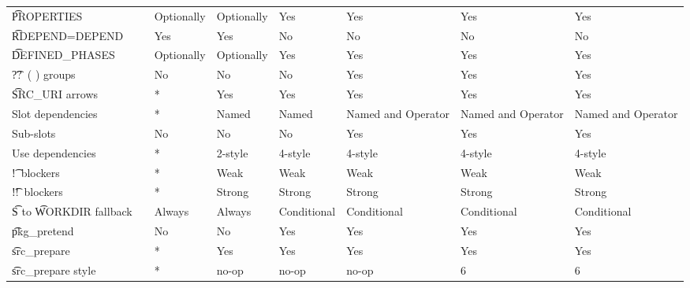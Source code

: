 \begin{landscape}
\begin{longtable}{llP{7.5em}P{7.5em}P{7.5em}P{7.5em}P{7.5em}P{7.5em}}
\t{PROPERTIES} &  &
    Optionally & Optionally & Yes & Yes & Yes & Yes \\

\t{RDEPEND=DEPEND} &  &
    Yes & Yes & No & No & No & No \\

\t{DEFINED_PHASES} &  &
    Optionally & Optionally & Yes & Yes & Yes & Yes \\

\t{??\ ( )} groups &  &
    No & No & No & Yes & Yes & Yes \\

\t{SRC_URI} arrows &  &
    * & Yes & Yes & Yes & Yes & Yes \\

Slot dependencies &  &
    * & Named & Named & Named and Operator & Named and Operator & Named and Operator \\

Sub-slots &  &
    No & No & No & Yes & Yes & Yes \\

Use dependencies &  &
    * & 2-style & 4-style & 4-style & 4-style & 4-style \\

\t{!}\ blockers &  &
    * & Weak & Weak & Weak & Weak & Weak \\

\t{!!}\ blockers &  &
    * & Strong & Strong & Strong & Strong & Strong \\

\t{S} to \t{WORKDIR} fallback &  &
    Always & Always & Conditional & Conditional & Conditional & Conditional \\

\t{pkg_pretend} &  &
    No & No & Yes & Yes & Yes & Yes \\

\t{src_prepare} &  &
    * & Yes & Yes & Yes & Yes & Yes \\

\t{src_prepare} style &  &
    * & no-op & no-op & no-op & 6 & 6 \\


\end{longtable}
\end{landscape}
